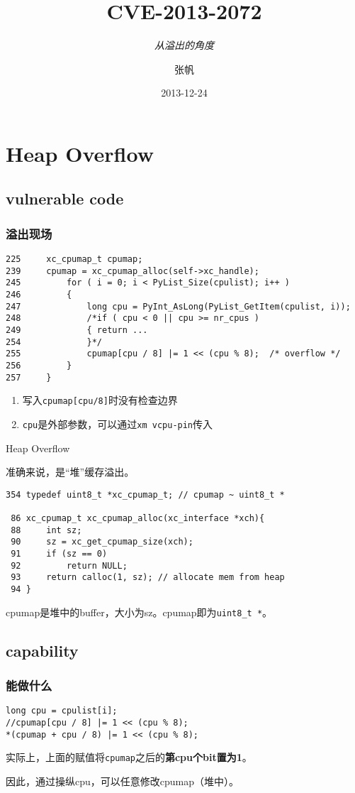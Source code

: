 \documentclass[t]{beamer}
\begin{document}
\title{CVE-2013-2072}
\subtitle{\textit{从溢出的角度}}
\author{张帆}
\date{2013-12-24}

\frame{\titlepage}


\section{Heap Overflow}
\subsection{vulnerable code}
\begin{frame}[fragile]
\frametitle{\kaishu 溢出现场}

\begin{lstlisting}[basicstyle=\footnotesize]
225     xc_cpumap_t cpumap; 
239     cpumap = xc_cpumap_alloc(self->xc_handle); 
245         for ( i = 0; i < PyList_Size(cpulist); i++ )
246         {
247             long cpu = PyInt_AsLong(PyList_GetItem(cpulist, i));
248             /*if ( cpu < 0 || cpu >= nr_cpus )
249             { return ...
254             }*/
255             cpumap[cpu / 8] |= 1 << (cpu % 8);  /* overflow */
256         }
257     }
\end{lstlisting}

\begin{enumerate}
\item 写入\texttt{cpumap[cpu/8]}时没有检查边界
\item \texttt{cpu}是外部参数，可以通过\texttt{xm vcpu-pin}传入
\end{enumerate}
\end{frame}

\begin{frame}[fragile]{Heap Overflow}

准确来说，是``堆''缓存溢出。

\begin{lstlisting}
354 typedef uint8_t *xc_cpumap_t; // cpumap ~ uint8_t *

 86 xc_cpumap_t xc_cpumap_alloc(xc_interface *xch){
 88     int sz;
 90     sz = xc_get_cpumap_size(xch);
 91     if (sz == 0)
 92         return NULL;
 93     return calloc(1, sz); // allocate mem from heap
 94 }
\end{lstlisting}
cpumap是堆中的buffer，大小为sz。cpumap即为\texttt{uint8\_t *}。
\end{frame}

\subsection{capability}
\begin{frame}[fragile]
\frametitle{\kaishu 能做什么}
\begin{lstlisting}
long cpu = cpulist[i];
//cpumap[cpu / 8] |= 1 << (cpu % 8);
*(cpumap + cpu / 8) |= 1 << (cpu % 8);
\end{lstlisting}


实际上，上面的赋值将\texttt{cpumap}之后的\textbf{第cpu个bit置为1}。

因此，通过操纵cpu，可以任意修改cpumap（堆中）。
\end{frame}
\end{document}
